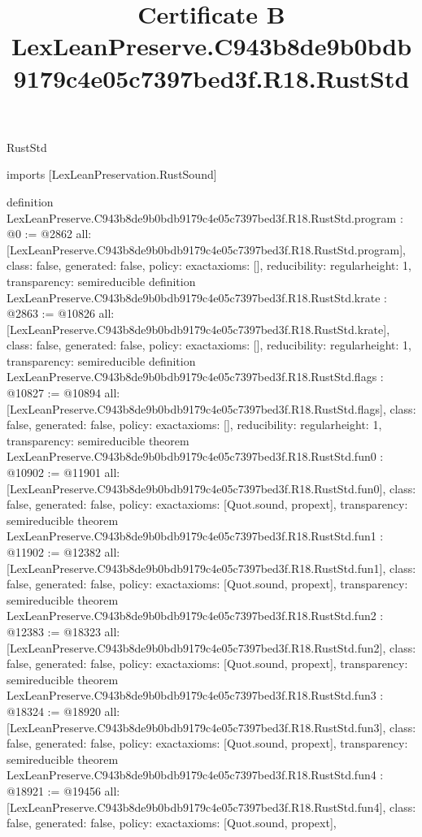 \begin{lexlean}{RustStd}
\title{Certificate B LexLeanPreserve.C943b8de9b0bdb9179c4e05c7397bed3f.R18.RustStd}
\begin{coremodule}
imports [LexLeanPreservation.RustSound]

definition LexLeanPreserve.C943b8de9b0bdb9179c4e05c7397bed3f.R18.RustStd.program : @0 := @2862 {
  all: [LexLeanPreserve.C943b8de9b0bdb9179c4e05c7397bed3f.R18.RustStd.program],
  class: false,
  generated: false,
  policy: exact{axioms: []},
  reducibility: regular{height: 1},
  transparency: semireducible
}
definition LexLeanPreserve.C943b8de9b0bdb9179c4e05c7397bed3f.R18.RustStd.krate : @2863 := @10826 {
  all: [LexLeanPreserve.C943b8de9b0bdb9179c4e05c7397bed3f.R18.RustStd.krate],
  class: false,
  generated: false,
  policy: exact{axioms: []},
  reducibility: regular{height: 1},
  transparency: semireducible
}
definition LexLeanPreserve.C943b8de9b0bdb9179c4e05c7397bed3f.R18.RustStd.flags : @10827 := @10894 {
  all: [LexLeanPreserve.C943b8de9b0bdb9179c4e05c7397bed3f.R18.RustStd.flags],
  class: false,
  generated: false,
  policy: exact{axioms: []},
  reducibility: regular{height: 1},
  transparency: semireducible
}
theorem LexLeanPreserve.C943b8de9b0bdb9179c4e05c7397bed3f.R18.RustStd.fun0 : @10902 := @11901 {
  all: [LexLeanPreserve.C943b8de9b0bdb9179c4e05c7397bed3f.R18.RustStd.fun0],
  class: false,
  generated: false,
  policy: exact{axioms: [Quot.sound, propext]},
  transparency: semireducible
}
theorem LexLeanPreserve.C943b8de9b0bdb9179c4e05c7397bed3f.R18.RustStd.fun1 : @11902 := @12382 {
  all: [LexLeanPreserve.C943b8de9b0bdb9179c4e05c7397bed3f.R18.RustStd.fun1],
  class: false,
  generated: false,
  policy: exact{axioms: [Quot.sound, propext]},
  transparency: semireducible
}
theorem LexLeanPreserve.C943b8de9b0bdb9179c4e05c7397bed3f.R18.RustStd.fun2 : @12383 := @18323 {
  all: [LexLeanPreserve.C943b8de9b0bdb9179c4e05c7397bed3f.R18.RustStd.fun2],
  class: false,
  generated: false,
  policy: exact{axioms: [Quot.sound, propext]},
  transparency: semireducible
}
theorem LexLeanPreserve.C943b8de9b0bdb9179c4e05c7397bed3f.R18.RustStd.fun3 : @18324 := @18920 {
  all: [LexLeanPreserve.C943b8de9b0bdb9179c4e05c7397bed3f.R18.RustStd.fun3],
  class: false,
  generated: false,
  policy: exact{axioms: [Quot.sound, propext]},
  transparency: semireducible
}
theorem LexLeanPreserve.C943b8de9b0bdb9179c4e05c7397bed3f.R18.RustStd.fun4 : @18921 := @19456 {
  all: [LexLeanPreserve.C943b8de9b0bdb9179c4e05c7397bed3f.R18.RustStd.fun4],
  class: false,
  generated: false,
  policy: exact{axioms: [Quot.sound, propext]},
}
\end{coremodule}
\end{lexlean}
